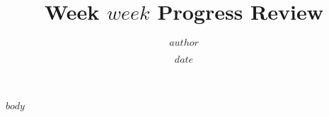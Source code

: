 \documentclass{beamer}
\title{Week $week$ Progress Review}
\author{$author$}
\date{$date$}
\begin{document}
\begin{frame}
\titlepage
\end{frame}

$body$
\end{document}
